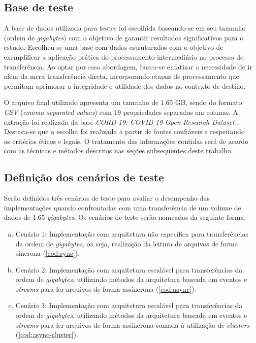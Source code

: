 \documentclass[12pt]{article}
\begin{document}
\subsection{Base de teste}

A base de dados utilizada para testes foi escolhida baseando-se em seu tamanho (ordem de \textit{gigabytes}) com
o objetivo de garantir resultados significativos para o estudo. Escolheu-se uma base com dados estruturados com o 
objetivo de exemplificar a aplicação prática do processamento intermediário no processo de transferência. 
Ao optar por essa abordagem, busca-se enfatizar a necessidade de ir além da mera transferência direta, 
incorporando etapas de processamento que permitam aprimorar a integridade e utilidade dos dados no contexto de destino.

O arquivo final utilizado apresenta um tamanho de 1.65 GB, sendo do formato \textit{CSV} (\textit{comma separated values}) 
com 19 propriedades separadas em colunas. A extração foi realizada da base 
\textit{CORD-19: COVID-19 Open Research Dataset} \cite{BASE}. Destaca-se que a escolha foi realizada a partir 
de fontes confiáveis e respeitando os critérios éticos e legais. O tratamento das informações contidas será de 
acordo com as técnicas e métodos descritos nas seções subsequentes deste trabalho.


\subsection{Definição dos cenários de teste}


Serão definidos três cenários de teste para avaliar o desempenho das implementações quando confrontadas
com uma transferência de um volume de dados de 1.65 \textit{gigabytes}. Os cenários de teste serão 
nomeados da seguinte forma:

\begin{enumerate}[a)]
\item Cenário 1: Implementação com arquitetura não específica para transferências da ordem de \textit{gigabytes}, 
ou seja, realização da leitura de arquivos de forma síncrona (\autoref{cod:sync}).
\item Cenário 2: Implementação com arquitetura escalável para transferências da ordem de \textit{gigabytes}, 
utilizando métodos da arquitetura baseada em eventos e \textit{streams} para ler arquivos de forma assíncrona (\autoref{cod:async}).
\item Cenário 3: Implementação com arquitetura escalável para transferências da ordem de \textit{gigabytes}, 
utilizando métodos da arquitetura baseada em eventos e \textit{streams} para ler arquivos de forma assíncrona somada à utilização de
\textit{clusters} (\autoref{cod:async-cluster}).
\end{enumerate}
\end{document}
